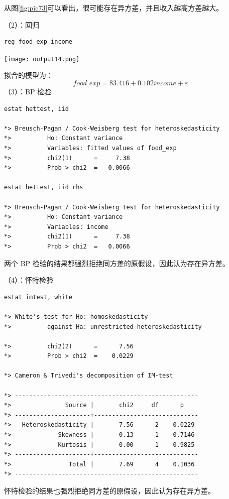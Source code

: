 \documentclass[cn,fancy,blue,11pt]{elegantbook}
\begin{document}
从图\ref{fig:pic73}可以看出，很可能存在异方差，并且收入越高方差越大。

（2）：回归

\begin{lstlisting}
reg food_exp income
\end{lstlisting}

\noindent\texttt{[image: output14.png]}

拟合的模型为：
\begin{equation}
  food\_exp = 83.416 + 0.102income + \varepsilon
\end{equation}
（3）：BP 检验

\begin{lstlisting}
estat hettest, iid

*> Breusch-Pagan / Cook-Weisberg test for heteroskedasticity
*>          Ho: Constant variance
*>          Variables: fitted values of food_exp
*>          chi2(1)      =     7.38
*>          Prob > chi2  =   0.0066

estat hettest, iid rhs

*> Breusch-Pagan / Cook-Weisberg test for heteroskedasticity
*>          Ho: Constant variance
*>          Variables: income
*>          chi2(1)      =     7.38
*>          Prob > chi2  =   0.0066
\end{lstlisting}

两个 BP 检验的结果都强烈拒绝同方差的原假设，因此认为存在异方差。

（4）：怀特检验

\begin{lstlisting}
estat imtest, white

*> White's test for Ho: homoskedasticity
*>          against Ha: unrestricted heteroskedasticity

*>          chi2(2)      =      7.56
*>          Prob > chi2  =    0.0229

*> Cameron & Trivedi's decomposition of IM-test

*> ---------------------------------------------------
*>               Source |       chi2     df      p
*> ---------------------+-----------------------------
*>   Heteroskedasticity |       7.56      2    0.0229
*>             Skewness |       0.13      1    0.7146
*>             Kurtosis |       0.00      1    0.9825
*> ---------------------+-----------------------------
*>                Total |       7.69      4    0.1036
*> ---------------------------------------------------
\end{lstlisting}

怀特检验的结果也强烈拒绝同方差的原假设，因此认为存在异方差。
\end{document}
